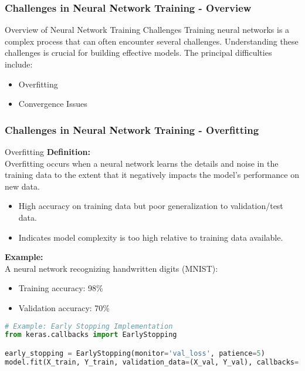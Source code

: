 \documentclass[aspectratio=169]{beamer}
\begin{document}
\begin{frame}[fragile]
    \frametitle{Challenges in Neural Network Training - Overview}
    \begin{block}{Overview of Neural Network Training Challenges}
        Training neural networks is a complex process that can often encounter several challenges. Understanding these challenges is crucial for building effective models. The principal difficulties include:
    \end{block}
    \begin{itemize}
        \item Overfitting
        \item Convergence Issues
    \end{itemize}
\end{frame}

\begin{frame}[fragile]
    \frametitle{Challenges in Neural Network Training - Overfitting}
    \begin{block}{Overfitting}
        \textbf{Definition:} \\
        Overfitting occurs when a neural network learns the details and noise in the training data to the extent that it negatively impacts the model's performance on new data.
    \end{block}

    \begin{itemize}
        \item High accuracy on training data but poor generalization to validation/test data.
        \item Indicates model complexity is too high relative to training data available.
    \end{itemize}

    \textbf{Example:} \\
    A neural network recognizing handwritten digits (MNIST):
    \begin{itemize}
        \item Training accuracy: 98\%
        \item Validation accuracy: 70\%
    \end{itemize}

    \begin{lstlisting}[language=Python, basicstyle=\small]
# Example: Early Stopping Implementation
from keras.callbacks import EarlyStopping

early_stopping = EarlyStopping(monitor='val_loss', patience=5)
model.fit(X_train, Y_train, validation_data=(X_val, Y_val), callbacks=[early_stopping])
    \end{lstlisting}
\end{frame}
\end{document}
